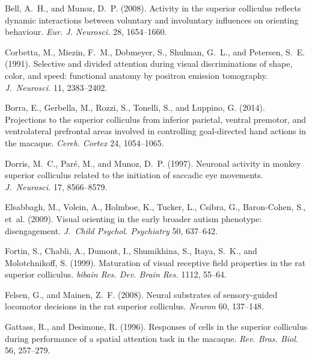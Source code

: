 \begin{thebibliography}{}

 Bell, A.~H., and
Munoz, D.~P.  (2008). Activity in the superior colliculus reflects
dynamic interactions between voluntary and involuntary influences on
orienting behaviour. \textit{Eur. J. Neurosci.} 28, 1654--1660.

 Corbetta, M.,
Miezin, F.~M., Dobmeyer, S., Shulman, G.~L., and Petersen, S.~E.
(1991). Selective and divided attention during visual discriminations
of shape, color, and speed: functional anatomy by positron emission
tomography. \textit{J.~Neurosci.} 11, 2383--2402.

 Borra, E., Gerbella,
M., Rozzi, S., Tonelli, S., and Luppino, G.  (2014). Projections to
the superior colliculus from inferior parietal, ventral premotor, and
ventrolateral prefrontal areas involved in controlling goal-directed
hand actions in the macaque. \textit{Cereb. Cortex} 24, 1054--1065.

 Dorris, M.~C.,
Par\'{e}, M., and Munoz, D.~P.  (1997). Neuronal activity in monkey
superior colliculus related to the initiation of saccadic eye
movements. \textit{J.~Neurosci.} 17, 8566--8579.

Elsabbagh, M.,
Volein, A., Holmboe, K., Tucker, L., Csibra, G., Baron-Cohen, S.,
et~al.  (2009). Visual orienting in the early broader autism
phenotype: disengagement. \textit{J.~Child Psychol. Psychiatry} 50,
637--642.

 Fortin, S., Chabli,
A., Dumont, I., Shumikhina, S., Itaya, S.~K., and Molotchnikoff, S.
(1999). Maturation of visual receptive field properties in the rat
superior colliculus. \textit{bibain Res. Dev. Brain Res.} 1112,
55--64.

 Felsen, G., and
Mainen, Z.~F.  (2008). Neural substrates of sensory-guided locomotor
decisions in the rat superior colliculus. \textit{Neuron} 60,
137--148.

 Gattass, R.,
and Desimone, R.  (1996). Responses of cells in the superior
colliculus during performance of a spatial attention task in the
macaque. \textit{Rev. Bras. Biol.} 56, 257--279.


\end{thebibliography}
